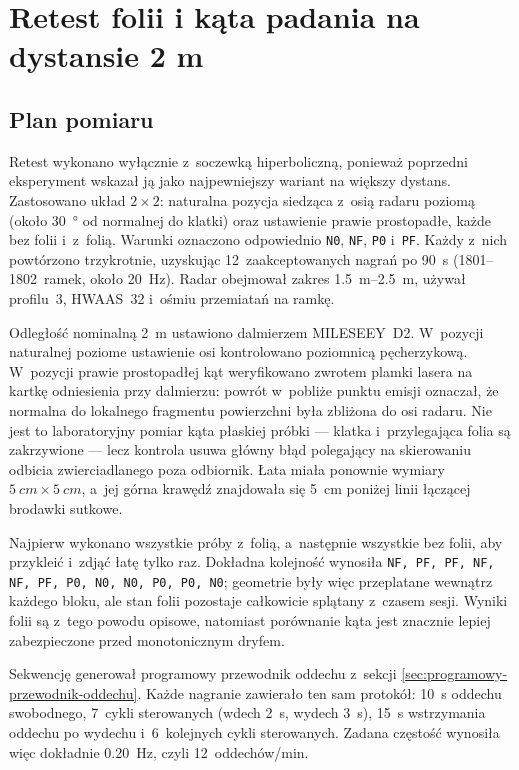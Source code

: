 \documentclass[12pt,a4paper,oneside]{report}
\begin{document}
\section{Retest folii i kąta padania na dystansie 2 m}
\label{sec:folia-2m}

\subsection{Plan pomiaru}

Retest wykonano wyłącznie z~soczewką hiperboliczną, ponieważ
poprzedni eksperyment wskazał ją jako najpewniejszy wariant na większy
dystans. Zastosowano układ $2\times2$: naturalna pozycja siedząca z~osią
radaru poziomą (około \SI{30}{\degree} od normalnej do klatki) oraz ustawienie
prawie prostopadłe, każde bez folii i~z~folią. Warunki oznaczono odpowiednio
\texttt{N0}, \texttt{NF}, \texttt{P0} i~\texttt{PF}. Każdy z~nich powtórzono
trzykrotnie, uzyskując 12~zaakceptowanych nagrań po \SI{90}{s}
(1801--1802~ramek, około \SI{20}{Hz}). Radar obejmował zakres
\SIrange{1.5}{2.5}{m}, używał profilu~3, HWAAS~32 i~ośmiu przemiatań na
ramkę.

Odległość nominalną \SI{2}{m} ustawiono dalmierzem MILESEEY~D2. W~pozycji
naturalnej poziome ustawienie osi kontrolowano poziomnicą pęcherzykową.
W~pozycji prawie prostopadłej kąt weryfikowano zwrotem plamki lasera na
kartkę odniesienia przy dalmierzu: powrót w~pobliże punktu emisji oznaczał,
że normalna do lokalnego fragmentu powierzchni była zbliżona do osi radaru.
Nie jest to laboratoryjny pomiar kąta płaskiej próbki --- klatka i~przylegająca
folia są zakrzywione --- lecz kontrola usuwa główny błąd polegający na
skierowaniu odbicia zwierciadlanego poza odbiornik. Łata miała ponownie
wymiary $\SI{5}{cm}\times\SI{5}{cm}$, a~jej górna krawędź znajdowała się
\SI{5}{cm} poniżej linii łączącej brodawki sutkowe.

Najpierw wykonano wszystkie próby z~folią, a~następnie wszystkie bez folii,
aby przykleić i~zdjąć łatę tylko raz. Dokładna kolejność wynosiła
\texttt{NF, PF, PF, NF, NF, PF, P0, N0, N0, P0, P0, N0}; geometrie były więc
przeplatane wewnątrz każdego bloku, ale stan folii pozostaje całkowicie
splątany z~czasem sesji. Wyniki folii są z~tego powodu opisowe, natomiast
porównanie kąta jest znacznie lepiej zabezpieczone przed monotonicznym dryfem.

Sekwencję generował programowy przewodnik oddechu z~sekcji
\ref{sec:programowy-przewodnik-oddechu}. Każde nagranie zawierało ten sam protokół:
\SI{10}{s} oddechu swobodnego,
7~cykli sterowanych (wdech \SI{2}{s}, wydech \SI{3}{s}), \SI{15}{s}
wstrzymania oddechu po wydechu i~6~kolejnych cykli sterowanych. Zadana
częstość wynosiła więc dokładnie \SI{0.20}{Hz}, czyli
12~oddechów/min.
\end{document}
